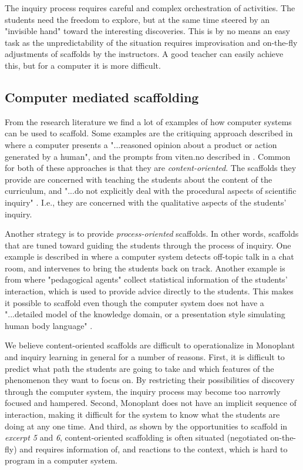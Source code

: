 The inquiry process requires careful and complex orchestration of activities. The students need the freedom to explore, but at the same time steered by an "invisible hand" toward the interesting discoveries. This is by no means an easy task as the unpredictability of the situation requires improvisation and on-the-fly adjustments of scaffolds by the instructors. A good teacher can easily achieve this, but for a computer it is more difficult. 

\subsection{Computer mediated scaffolding}
From the research literature we find a lot of examples of how computer systems can be used to scaffold. Some examples are the critiquing approach described in \citet[p. 1]{fischer1991critics} where a computer presents a "...reasoned opinion about a product or action generated by a human", and the prompts from viten.no described in \citep{furberg2009socio}. Common for both of these approaches is that they are \emph{content-oriented}. The scaffolds they provide are concerned with teaching the students about the content of the curriculum, and "...do not explicitly deal with the procedural aspects of scientific inquiry" \citep[p. 400]{furberg2009socio}. I.e., they are concerned with the qualitative aspects of the students' inquiry. 

Another strategy is to provide \emph{process-oriented} scaffolds. In other words, scaffolds that are tuned toward guiding the students through the process of inquiry. One example is described in \citet{soller2005mirroring} where a computer system detects off-topic talk in a chat room, and intervenes to bring the students back on track. Another example is from \citet{morch2003integrating} where "pedagogical agents" collect statistical information of the students' interaction, which is used to provide advice directly to the students. This makes it possible to scaffold even though the computer system does not have a "...detailed model of the knowledge domain, or a presentation style simulating human body language" \citep[p. 2]{morch2003integrating}. 

We believe content-oriented scaffolds are difficult to operationalize in Monoplant and inquiry learning in general for a number of reasons. First, it is difficult to predict what path the students are going to take and which features of the phenomenon they want to focus on. By restricting their possibilities of discovery through the computer system, the inquiry process may become too narrowly focused and hampered. Second, Monoplant does not have an implicit sequence of interaction, making it difficult for the system to know what the students are doing at any one time. And third, as shown by the opportunities to scaffold in \emph{excerpt 5} and \emph{6}, content-oriented scaffolding is often situated (negotiated on-the-fly) and requires information of, and reactions to the context, which is hard to program in a computer system. 

